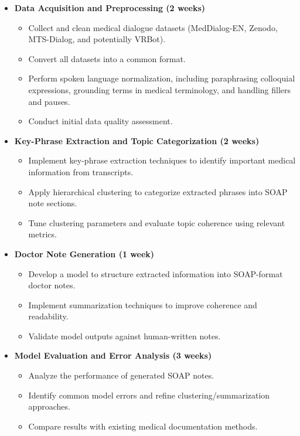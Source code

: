\documentclass[11pt,a4paper]{article}
\begin{document}
\begin{itemize}
    \item \textbf{Data Acquisition and Preprocessing (2 weeks)}
    \begin{itemize}
        \item Collect and clean medical dialogue datasets (MedDialog-EN, Zenodo, MTS-Dialog, and potentially VRBot).
        \item Convert all datasets into a common format.
        \item Perform spoken language normalization, including paraphrasing colloquial expressions, grounding terms in medical terminology, and handling fillers and pauses.
        \item Conduct initial data quality assessment.
    \end{itemize}

    \item \textbf{Key-Phrase Extraction and Topic Categorization (2 weeks)}
    \begin{itemize}
        \item Implement key-phrase extraction techniques to identify important medical information from transcripts.
        \item Apply hierarchical clustering to categorize extracted phrases into SOAP note sections.
        \item Tune clustering parameters and evaluate topic coherence using relevant metrics.
    \end{itemize}

    \item \textbf{Doctor Note Generation (1 week)}
    \begin{itemize}
        \item Develop a model to structure extracted information into SOAP-format doctor notes.
        \item Implement summarization techniques to improve coherence and readability.
        \item Validate model outputs against human-written notes.
    \end{itemize}

    \item \textbf{Model Evaluation and Error Analysis (3 weeks)}
    \begin{itemize}
        \item Analyze the performance of generated SOAP notes.
        \item Identify common model errors and refine clustering/summarization approaches.
        \item Compare results with existing medical documentation methods.
    \end{itemize}


\end{itemize}
\end{document}
